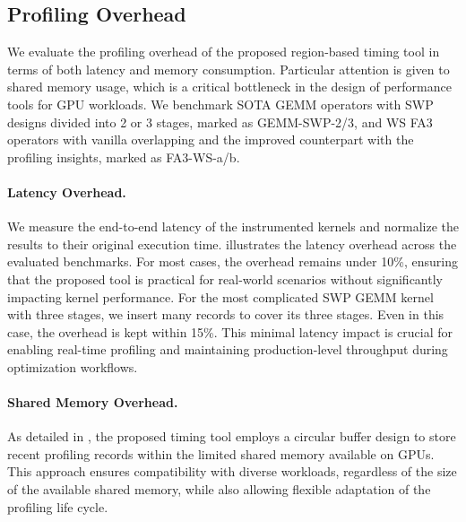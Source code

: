 \subsection{Profiling Overhead}
We evaluate the profiling overhead of the proposed region-based timing tool in terms of both latency and memory consumption. Particular attention is given to shared memory usage, which is a critical bottleneck in the design of performance tools for GPU workloads.
We benchmark SOTA GEMM operators with SWP designs divided into 2 or 3 stages, marked as GEMM-SWP-2/3, and WS FA3 operators with vanilla overlapping and the improved counterpart with the profiling insights, marked as FA3-WS-a/b.

\paragraph{Latency Overhead.}
We measure the end-to-end latency of the instrumented kernels and normalize the results to their original execution time. \Fig{\ref{fig:latency_overhead}} illustrates the latency overhead across the evaluated benchmarks. For most cases, the overhead remains under 10\%, ensuring that the proposed tool is practical for real-world scenarios without significantly impacting kernel performance. 
For the most complicated SWP GEMM kernel with three stages, we insert many records to cover its three stages.
Even in this case, the overhead is kept within 15\%.
This minimal latency impact is crucial for enabling real-time profiling and maintaining production-level throughput during optimization workflows.




\paragraph{Shared Memory Overhead.}
As detailed in \Sec{\ref{sec:profiler:memory}}, the proposed timing tool employs a circular buffer design to store recent profiling records within the limited shared memory available on GPUs. This approach ensures compatibility with diverse workloads, regardless of the size of the available shared memory, while also allowing flexible adaptation of the profiling life cycle.

